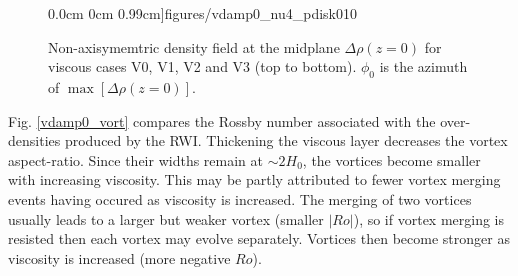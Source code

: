\begin{figure}
   0.0cm 0cm
   0.99cm]{figures/vdamp0_nu4_pdisk010}
   \caption{Non-axisymemtric density field at the midplane
     $\Delta\rho(z=0)$ for viscous cases V0, V1, V2 and V3 (top to
     bottom). $\phi_0$ is the azimuth of $\max[\Delta\rho(z=0)]$. 
     \label{vdamp0}}
\end{figure}

Fig. \ref{vdamp0_vort} compares the Rossby number associated with the
over-densities produced by the RWI. Thickening the viscous 
layer decreases the vortex aspect-ratio. Since their widths remain
at $\sim 2H_0$, the vortices become smaller with increasing
viscosity. This may be partly attributed to fewer vortex merging
events having occured as viscosity is increased. The merging of
two vortices usually leads to a larger but weaker vortex (smaller
$|Ro|$), so if vortex merging is resisted then each vortex may evolve
separately. Vortices then become stronger as viscosity is increased
(more negative $Ro$).

